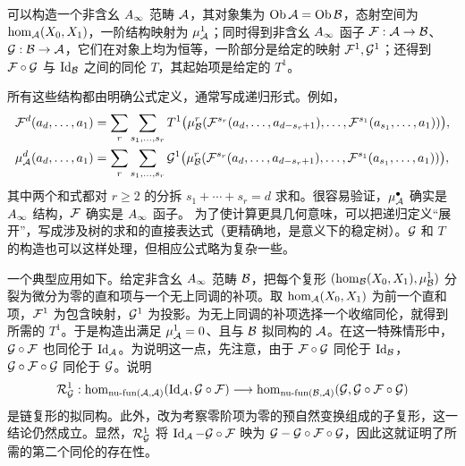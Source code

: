 \begin{proposition}\label{st:1.12}
可以构造一个非含幺 $A_\infty$ 范畴 $\mathcal A$，其对象集为 $\operatorname{Ob}\mathcal A=\operatorname{Ob}\mathcal B$，态射空间为 $\hom_{\mathcal A}(X_0,X_1)$，一阶结构映射为 $\mu^1_{\mathcal A}$；同时得到非含幺 $A_\infty$ 函子 $\mathcal F:\mathcal A\to\mathcal B$、$\mathcal G:\mathcal B\to\mathcal A$，它们在对象上均为恒等，一阶部分是给定的映射 $\mathcal F^1,\mathcal G^1$；还得到 $\mathcal F\circ\mathcal G$ 与 $\operatorname{Id}_{\mathcal B}$ 之间的同伦 $T$，其起始项是给定的 $T^1$。
\end{proposition}

所有这些结构都由明确公式定义，通常写成递归形式。例如，
\begin{equation}\label{eq:1.18}
\begin{aligned}
\mathcal F^d(a_d,\ldots,a_1)
&=\sum_r\sum_{s_1,\ldots,s_r}T^1\bigl(\mu^r_{\mathcal B}(\mathcal F^{s_r}(a_d,\ldots,a_{d-s_r+1}),\ldots,\mathcal F^{s_1}(a_{s_1},\ldots,a_1))\bigr),\\
\mu^d_{\mathcal A}(a_d,\ldots,a_1)
&=\sum_r\sum_{s_1,\ldots,s_r}\mathcal G^1\bigl(\mu^r_{\mathcal B}(\mathcal F^{s_r}(a_d,\ldots,a_{d-s_r+1}),\ldots,\mathcal F^{s_1}(a_{s_1},\ldots,a_1))\bigr),
\end{aligned}
\end{equation}
其中两个和式都对 $r\ge2$ 的分拆 $s_1+\cdots+s_r=d$ 求和。很容易验证，$\mu^{\bullet}_{\mathcal A}$ 确实是 $A_\infty$ 结构，$\mathcal F$ 确实是 $A_\infty$ 函子。
为了使计算更具几何意味，可以把递归定义“展开”，写成涉及树的求和的直接表达式（更精确地，是意义下的稳定树）。$\mathcal G$ 和 $T$ 的构造也可以这样处理，但相应公式略为复杂一些。

\begin{note}\label{st:1.13}
一个典型应用如下。给定非含幺 $A_\infty$ 范畴 $\mathcal B$，把每个复形 $(\hom_{\mathcal B}(X_0,X_1),\mu^1_{\mathcal B})$ 分裂为微分为零的直和项与一个无上同调的补项。取 $\hom_{\mathcal A}(X_0,X_1)$ 为前一个直和项，$\mathcal F^1$ 为包含映射，$\mathcal G^1$ 为投影。为无上同调的补项选择一个收缩同伦，就得到所需的 $T^1$。于是构造出满足 $\mu^1_{\mathcal A}=0$、且与 $\mathcal B$ 拟同构的 $\mathcal A$。在这一特殊情形中，$\mathcal G\circ\mathcal F$ 也同伦于 $\operatorname{Id}_{\mathcal A}$。为说明这一点，先注意，由于 $\mathcal F\circ\mathcal G$ 同伦于 $\operatorname{Id}_{\mathcal B}$，$\mathcal G\circ\mathcal F\circ\mathcal G$ 同伦于 $\mathcal G$。说明
\[
\mathcal R^1_{\mathcal G}:\hom_{\operatorname{nu\text{-}fun}(\mathcal A,\mathcal A)}(\operatorname{Id}_{\mathcal A},\mathcal G\circ\mathcal F)
\longrightarrow\hom_{\operatorname{nu\text{-}fun}(\mathcal B,\mathcal A)}(\mathcal G,\mathcal G\circ\mathcal F\circ\mathcal G)
\]
是链复形的拟同构。此外，改为考察零阶项为零的预自然变换组成的子复形，这一结论仍然成立。显然，$\mathcal R^1_{\mathcal G}$ 将 $\operatorname{Id}_{\mathcal A}-\mathcal G\circ\mathcal F$ 映为 $\mathcal G-\mathcal G\circ\mathcal F\circ\mathcal G$，因此这就证明了所需的第二个同伦的存在性。
\end{note}


